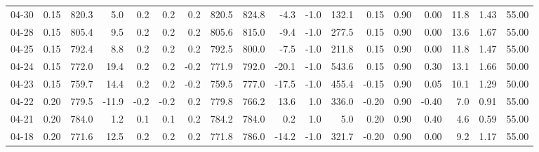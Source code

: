 \begin{threeparttable}
{\begin{tabular}{lrrrrrrrrrrrrrrrrr}
  04-30 &     0.15 & 820.3 &               5.0 &               0.2 &                0.2 &                0.2 & 820.5 & 824.8 &       -4.3 &                     -1.0 &               132.1 &       0.15 &      0.90 &           0.00 &             11.8 &            1.43 &                  55.00 \\
  04-28 &     0.15 & 805.4 &               9.5 &               0.2 &                0.2 &                0.2 & 805.6 & 815.0 &       -9.4 &                     -1.0 &               277.5 &       0.15 &      0.90 &           0.00 &             13.6 &            1.67 &                  55.00 \\
  04-25 &     0.15 & 792.4 &               8.8 &               0.2 &                0.2 &                0.2 & 792.5 & 800.0 &       -7.5 &                     -1.0 &               211.8 &       0.15 &      0.90 &           0.00 &             11.8 &            1.47 &                  55.00 \\
  04-24 &     0.15 & 772.0 &              19.4 &               0.2 &                0.2 &               -0.2 & 771.9 & 792.0 &      -20.1 &                     -1.0 &               543.6 &       0.15 &      0.90 &           0.30 &             13.1 &            1.66 &                  50.00 \\
  04-23 &     0.15 & 759.7 &              14.4 &               0.2 &                0.2 &               -0.2 & 759.5 & 777.0 &      -17.5 &                     -1.0 &               455.4 &      -0.15 &      0.90 &           0.05 &             10.1 &            1.29 &                  50.00 \\
  04-22 &     0.20 & 779.5 &             -11.9 &              -0.2 &               -0.2 &                0.2 & 779.8 & 766.2 &       13.6 &                      1.0 &               336.0 &      -0.20 &      0.90 &          -0.40 &              7.0 &            0.91 &                  55.00 \\
  04-21 &     0.20 & 784.0 &               1.2 &               0.1 &                0.1 &                0.2 & 784.2 & 784.0 &        0.2 &                      1.0 &                 5.0 &       0.20 &      0.90 &           0.40 &              4.6 &            0.59 &                  55.00 \\
  04-18 &     0.20 & 771.6 &              12.5 &               0.2 &                0.2 &                0.2 & 771.8 & 786.0 &      -14.2 &                     -1.0 &               321.7 &      -0.20 &      0.90 &           0.00 &              9.2 &            1.17 &                  55.00 \\

\end{tabular}}
\end{threeparttable}
